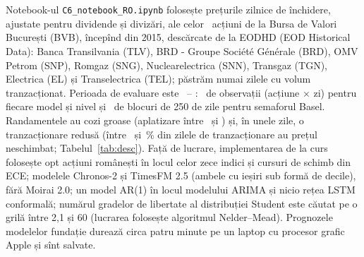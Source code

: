 \section{}
%
{Notebook-ul \texttt{C6\_notebook\_RO.ipynb} folosește prețurile zilnice de închidere, ajustate pentru dividende și divizări, ale celor \NnStocks\ acțiuni de la Bursa de Valori București (BVB), începînd din 2015, descărcate de la EODHD (EOD Historical Data): Banca Transilvania (TLV), BRD - Groupe Société Générale (BRD), OMV Petrom (SNP), Romgaz (SNG), Nuclearelectrica (SNN), Transgaz (TGN), Electrica (EL) și Transelectrica (TEL); păstrăm numai zilele cu volum tranzacționat.
Perioada de evaluare este \NoosStart\ -- \NoosEnd: \NnOOS\ de observații (acțiune $\times$ zi) pentru fiecare model și nivel și \NnBlocks\ de blocuri de 250 de zile pentru semaforul Basel. Randamentele au cozi groase (aplatizare între \NkurtMin\ și \NkurtMax) și, în unele zile, o tranzacționare redusă (între \NzeroMin\ și \NzeroMax\,\% din zilele de tranzacționare au prețul neschimbat; Tabelul~\ref{tab:desc}).
Față de lucrare, implementarea de la curs folosește opt acțiuni românești în locul celor zece indici și cursuri de schimb din ECE; modelele Chronos-2 și TimesFM 2.5 (ambele cu ieșiri sub formă de decile), fără Moirai 2.0; un model AR(1) în locul modelului ARIMA și nicio rețea LSTM conformală; numărul gradelor de libertate al distribuției Student este căutat pe o grilă între 2,1 și 60 (lucrarea folosește algoritmul Nelder--Mead). Prognozele modelelor fundație durează circa patru minute pe un laptop cu procesor grafic Apple și sînt salvate.}

